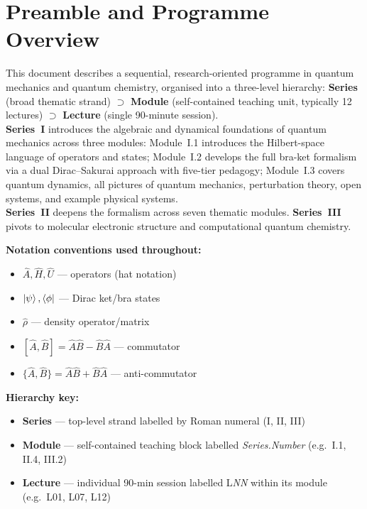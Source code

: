 \documentclass[11pt,a4paper]{article}
\newcommand{\coursebadge}[1]{%
  \begin{tcolorbox}[highlightbox]#1\end{tcolorbox}%
}
\begin{document}
\tableofcontents
\newpage

\section*{Preamble and Programme Overview}

\coursebadge{%
  This document describes a sequential, research-oriented programme in quantum
  mechanics and quantum chemistry, organised into a three-level hierarchy:
  \textbf{Series} (broad thematic strand) $\supset$ \textbf{Module} (self-contained
  teaching unit, typically 12 lectures) $\supset$ \textbf{Lecture} (single 90-minute
  session).\\[4pt]
  \textbf{Series~I} introduces the algebraic and dynamical foundations of quantum
  mechanics across three modules:
  Module~I.1 introduces the Hilbert-space language of operators and states;
  Module~I.2 develops the full bra-ket formalism via a dual Dirac--Sakurai approach
  with five-tier pedagogy;
  Module~I.3 covers quantum dynamics, all pictures of quantum mechanics, perturbation
  theory, open systems, and example physical systems.\\[2pt]
  \textbf{Series~II} deepens the formalism across seven thematic modules.
  \textbf{Series~III} pivots to molecular electronic structure and computational
  quantum chemistry.
}

\medskip
\noindent\textbf{Notation conventions used throughout:}
\begin{itemize}[leftmargin=1.5em]
  \item $\hat{A}, \hat{H}, \hat{U}$ --- operators (hat notation)
  \item $\ket{\psi}, \bra{\phi}$ --- Dirac ket/bra states
  \item $\hat{\rho}$ --- density operator/matrix
  \item $[\hat{A},\hat{B}]=\hat{A}\hat{B}-\hat{B}\hat{A}$ --- commutator
  \item $\{\hat{A},\hat{B}\}=\hat{A}\hat{B}+\hat{B}\hat{A}$ --- anti-commutator
\end{itemize}

\medskip
\noindent\textbf{Hierarchy key:}
\begin{itemize}[leftmargin=1.5em]
  \item \textbf{Series} --- top-level strand labelled by Roman numeral (I, II, III)
  \item \textbf{Module} --- self-contained teaching block labelled \textit{Series.Number}
    (e.g.\ I.1, II.4, III.2)
  \item \textbf{Lecture} --- individual 90-min session labelled L\textit{NN} within its
    module (e.g.\ L01, L07, L12)
\end{itemize}
\end{document}
